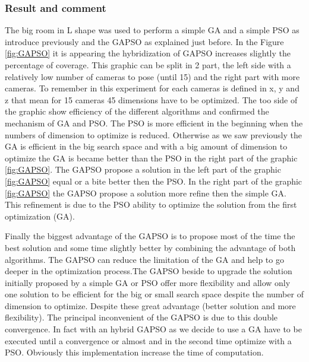  \subsubsection{Result and comment }
  

The big room in L shape was used to perform a simple GA and a simple PSO as introduce previously and the GAPSO as explained just before. In the Figure \ref{fig:GAPSO} it is appearing the hybridization of GAPSO increases slightly the percentage of coverage.%
This graphic can be split in 2 part, the left side with a relatively low number of cameras to pose (until 15) and the right part with more cameras. To remember in this experiment for each cameras is defined in x, y and z that mean for 15 cameras 45 dimensions have to be optimized.
The too side of the graphic show efficiency  of the different algorithms and confirmed  the mechanism of GA and PSO.
The PSO is more efficient in the beginning when the numbers of dimension to optimize is reduced. Otherwise as we saw previously the GA is efficient in the big search space and with a big amount of dimension to optimize the GA is became better than the PSO in the right part of the graphic \ref{fig:GAPSO}. 
The GAPSO propose a solution in the left part of the graphic \ref{fig:GAPSO} equal or a bite better then the PSO. In the right part of the graphic \ref{fig:GAPSO} the GAPSO propose a solution more refine then the simple GA. This refinement is due to the PSO ability to optimize the solution from the first optimization (GA). 

Finally the biggest advantage of the GAPSO is to propose most of the time the best solution and some time slightly better by combining the advantage of both algorithms. 
The GAPSO can reduce the limitation of the GA and help to go deeper in the optimization process.The GAPSO  beside to upgrade the solution initially proposed by a simple GA or PSO offer more flexibility and allow only one solution to be efficient for the big or small search space despite the number of dimension to optimize.
Despite these great advantage (better solution and more flexibility).
The principal inconvenient of the GAPSO is due to this double convergence. In fact with an hybrid GAPSO as we decide to use a GA have to be executed until a convergence or almost and in the second time optimize with a PSO. Obviously this implementation increase the time of computation.
 
